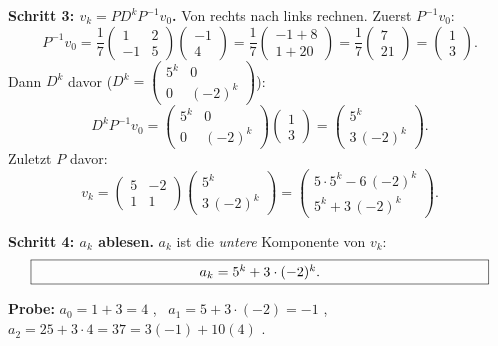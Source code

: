 \documentclass[a4paper,12pt]{article}
\begin{document}
\textbf{Schritt 3: $v_k = P D^k P^{-1} v_0$.} Von rechts nach links rechnen. Zuerst $P^{-1} v_0$:
\[
P^{-1} v_0 = \frac{1}{7}\begin{pmatrix} 1 & 2 \\ -1 & 5 \end{pmatrix}\begin{pmatrix} -1 \\ 4 \end{pmatrix} = \frac{1}{7}\begin{pmatrix} -1 + 8 \\ 1 + 20 \end{pmatrix} = \frac{1}{7}\begin{pmatrix} 7 \\ 21 \end{pmatrix} = \begin{pmatrix} 1 \\ 3 \end{pmatrix}.
\]
Dann $D^k$ davor ($D^k = \left(\begin{smallmatrix} 5^k & 0 \\ 0 & (-2)^k \end{smallmatrix}\right)$):
\[
D^k P^{-1} v_0 = \begin{pmatrix} 5^k & 0 \\ 0 & (-2)^k \end{pmatrix}\begin{pmatrix} 1 \\ 3 \end{pmatrix} = \begin{pmatrix} 5^k \\ 3\,(-2)^k \end{pmatrix}.
\]
Zuletzt $P$ davor:
\[
v_k = \begin{pmatrix} 5 & -2 \\ 1 & 1 \end{pmatrix}\begin{pmatrix} 5^k \\ 3\,(-2)^k \end{pmatrix} = \begin{pmatrix} 5\cdot 5^k - 6\,(-2)^k \\ 5^k + 3\,(-2)^k \end{pmatrix}.
\]

\textbf{Schritt 4: $a_k$ ablesen.} $a_k$ ist die \emph{untere} Komponente von $v_k$:
\[
\fbox{\parbox{0.93\textwidth}{\centering
$a_k = 5^k + 3\cdot(-2)^k.$
}}
\]

\textbf{Probe:} $a_0 = 1 + 3 = 4$ \checkmark, \ $a_1 = 5 + 3\cdot(-2) = -1$ \checkmark, \ $a_2 = 25 + 3\cdot 4 = 37 = 3(-1) + 10(4)$ \checkmark.
\end{document}
